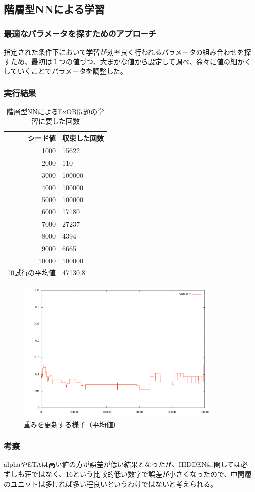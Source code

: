 \subsection{階層型NNによる学習}
\subsubsection{最適なパラメータを探すためのアプローチ}
指定された条件下において学習が効率良く行われるパラメータの組み合わせを探
すため、最初は１つの値づつ、大まかな値から設定して調べ、徐々に値の細かくしていくことでパラメータを調整した。

\subsubsection{実行結果}

\begin{table}[htb]
 \begin{center}
  \caption{階層型NNによるExOR問題の学習に要した回数}
  \label{table:level2}
  \begin{tabular}[htb]{r|l} \hline
   シード値 & 収束した回数 \\ \hline \hline
   1000 &  15622\\ \hline
   2000 &  110\\ \hline
   3000 &  100000\\ \hline
   4000 &  100000\\ \hline
   5000 &  100000\\ \hline
   6000 &  17180\\ \hline
   7000 &  27237\\ \hline
   8000 &  4394\\ \hline
   9000 &  6665\\ \hline
   10000 &  100000\\ \hline \hline
   10試行の平均値 &  47130.8\\ \hline
  \end{tabular}
 \end{center}
\end{table}

\begin{figure}[h]
 \begin{center}
  \includegraphics[width=10.0cm]{level2/exor_ave.pdf}
  \caption{重みを更新する様子（平均値）}
  \label{fig:level2}
 \end{center}
\end{figure}


\subsubsection{考察}
alphaやETAは高い値の方が誤差が低い結果となったが、HIDDENに関しては必ずしも荘ではなく、16という比較的低い数字で誤差が小さくなったので、中間層のユニットは多ければ多い程良いというわけではないと考えられる。
